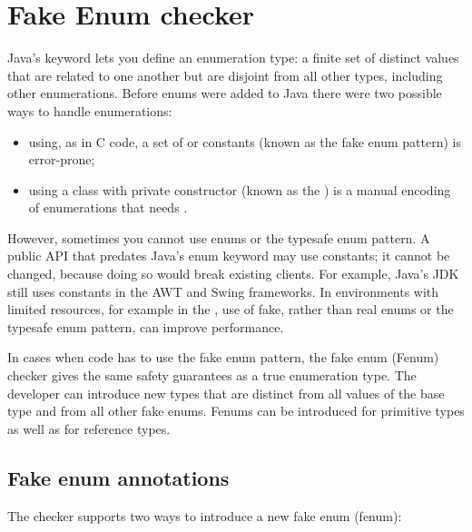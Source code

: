 \htmlhr
\chapter{Fake Enum checker\label{fenum-checker}}

Java's 
keyword lets you define an enumeration type: a finite set of distinct values
that are related to one another but are disjoint from all other
types, including other enumerations.
Before enums were added to Java there were two possible ways to handle
enumerations:

\begin{itemize}
\item using, as in C code, a set of  or  constants (known
as the fake enum pattern) is error-prone;

\item using a class with private constructor (known as the
) is a manual encoding of enumerations that needs
.
\end{itemize}


However, sometimes you cannot use enums or the typesafe enum pattern.
A public API that predates Java's enum keyword may use  constants;
it cannot be changed, because doing so would break existing clients.
For example, Java's JDK still uses  constants in the AWT and Swing
frameworks.
In environments with limited resources, for example in the
, use of fake, rather than real enums or the typesafe enum pattern, can
improve performance.

In cases when code has to use the fake enum pattern, the fake enum (Fenum)
checker gives the same safety guarantees as a true enumeration type. 
The developer can introduce new types that are distinct from all values of the
base type and from all other fake enums. Fenums can be introduced for
primitive types as well as for reference types.


\section{Fake enum annotations}

The checker supports two ways to introduce a new fake enum (fenum):

